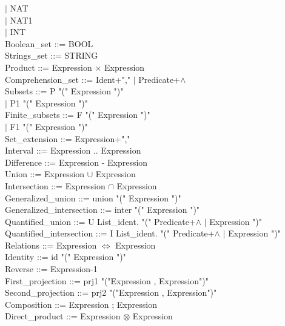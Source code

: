 \documentclass[12pt,a4paper,draft]{article}
\begin{document}
{\begin{sloppypar}
  \hspace*{0.20in} $|$  NAT\\
  \hspace*{0.20in} $|$  NAT1\\
  \hspace*{0.20in} $|$  INT\\
Boolean\_set    ::=  BOOL\\
Strings\_set   ::=  STRING\\
Product   ::=  Expression $\times$ Expression \\
Comprehension\_set ::= { Ident+","\hspace*{0.20in} $|$ Predicate+$\land$ } \\
Subsets   ::=  P "(" Expression ")"\\
   \hspace*{0.20in} $|$  P1 "(" Expression ")" \\
Finite\_subsets  ::=  F "(" Expression ")"\\
   \hspace*{0.20in} $|$  F1 "(" Expression ")" \\
Set\_extension  ::= { Expression+"," } \\
Interval   ::=  Expression .. Expression \\
Difference   ::=  Expression - Expression\\ 
Union     ::=  Expression $\cup$ Expression \\
Intersection   ::=  Expression $\cap$ Expression \\
Generalized\_union  ::= union "(" Expression ")" \\
Generalized\_intersection ::= inter "(" Expression ")" \\
Quantified\_union ::=  U List\_ident. "(" Predicate+$\land$ $|$ Expression ")" \\
Quantified\_intersection ::=  I List\_ident. "(" Predicate+$\land$ $|$ Expression ")" \\
Relations   ::=  Expression $\Leftrightarrow$ Expression \\
Identity   ::= id "(" Expression ")" \\
Reverse   ::=  Expression-1 \\
First\_projection  ::= prj1 "("Expression , Expression")" \\
Second\_projection   ::= prj2 "("Expression , Expression")" \\
Composition   ::=  Expression ; Expression \\
Direct\_product  ::=  Expression $\otimes$ Expression\\ 

\end{sloppypar}}
\end{document}
